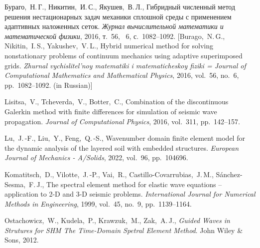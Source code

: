 \documentclass[press]{vestnik}
\begin{document}
%
%
\begin{thebibliography}{23}

%

Бураго,~Н.\,Г., Никитин,~И.\,С., Якушев,~В.\,Л., Гибридный численный метод решения нестационарных задач механики сплошной среды с применением адаптивных наложенных сеток. \emph{Журнал вычислительной математики и математической физики}, 2016, т.~56, \No~6, с.~1082--1092. [Burago,~N.\,G., Nikitin,~I.\,S., Yakushev,~V.\,L., Hybrid numerical method for solving nonstationary problems of continuum mechanics using adaptive superimposed grids. \emph{Zhurnal vychislitel’noy matematiki i matematicheskoy fiziki = Journal of Computational Mathematics and Mathematical Physics}, 2016, vol.~56, no.~6, pp.~1082--1092. (in Russian)] 

Lisitsa,~V., Tcheverda,~V., Botter,~C., Combination of the discontinuous Galerkin method with finite differences for simulation of seismic wave propagation. \emph{Journal of Computational Physics}, 2016, vol.~311, pp.~142--157. 

Lu,~J.\,-F., Liu,~Y., Feng,~Q.\,-S., Wavenumber domain finite element model for the dynamic analysis of the layered soil with embedded structures. \emph{European Journal of Mechanics - A/Solids}, 2022, vol.~96, pp.~104696. 

Komatitsch,~D., Vilotte,~J.\,-P., Vai,~R., Castillo-Covarrubias,~J.\,M., Sánchez-Sesma,~F.\,J., The spectral element method for elastic wave equations – application to 2-D and 3-D seismic problems. \emph{International Journal for Numerical Methods in Engineering}, 1999, vol.~45, no.~9, pp.~1139--1164. 

Ostachowicz,~W., Kudela,~P., Krawzuk,~M., Zak,~A.\,J., \emph{Guided Waves in Strutures for SHM The Time-Domain Spetral Element Method}. John Wiley \& Sons, 2012. 


\end{thebibliography}
\end{document}
